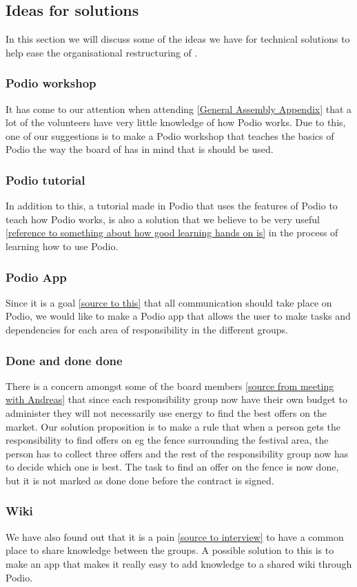 \subsection{Ideas for solutions}
In this section we will discuss some of the ideas we have for technical
solutions to help ease the organisational restructuring of \mil.

\subsubsection{Podio workshop}
It has come to our attention when attending \ref{General Assembly Appendix} that
a lot of the volunteers have very little knowledge of how Podio works. Due to
this, one of our suggestions is to make a Podio workshop that teaches the basics
of Podio the way the board of \mil has in mind that is should be used.

\subsubsection{Podio tutorial}
In addition to this, a tutorial made in Podio that uses the features of Podio to
teach how Podio works, is also a solution that we believe to be very useful
\ref{reference to something about how good learning hands on is} in the process
of learning how to use Podio.

\subsubsection{Podio App}
Since it is a goal \ref{source to this} that all communication should take place
on Podio, we would like to make a Podio app that allows the user to make tasks
and dependencies for each area of responsibility in the different groups.

\subsubsection{Done and done done}
There is a concern amongst some of the board members \ref{source from meeting
with Andreas} that since each responsibility group now have their own budget to
administer they will not necessarily use energy to find the best offers on the
market. Our solution proposition is to make a rule that when a person gets the
responsibility to find offers on eg the fence surrounding the festival area, the
person has to collect three offers and the rest of the responsibility group now
has to decide which one is best. The task to find an offer on the fence is now
done, but it is not marked as done done before the contract is signed.

\subsubsection{Wiki}
We have also found out that it is a pain \ref{source to interview} to have a
common place to share knowledge between the groups. A possible solution to this
is to make an app that makes it really easy to add knowledge to a shared wiki
through Podio.

